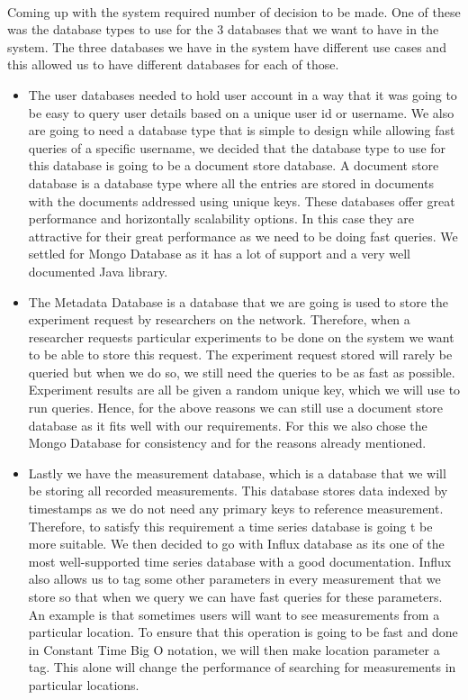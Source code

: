 \paragraph{}
Coming up with the system required number of decision to be made.
One of these was the database types to use for the 3 databases that we want to have in the system.
The three databases we have in the system have different use cases and this allowed us to have different databases for each of those.
\begin{itemize}
    \item The user databases needed to hold user account in a way that it was going to be easy to query user details based on a unique user id or username.
    We also are going to need a database type that is simple to design while allowing fast queries of a specific username, we decided that the database type to use for this database is going to be a document store database.
    A document store database is a database type where all the entries are stored in documents with the documents addressed using unique keys\cite{nosql_dbs}.
    These databases offer great performance and horizontally scalability options\cite{nosql_dbs}.
    In this case they are attractive for their great performance as we need to be doing fast queries.
    We settled for Mongo Database as it has a lot of support and a very well documented Java library.
    \item The Metadata Database is a database that we are going is used to store the experiment request by researchers on the network.
    Therefore, when a researcher requests particular experiments to be done on the system we want to be able to store this request.
    The experiment request stored will rarely be queried but when we do so, we still  need the queries to be as fast as possible.
    Experiment results are all be given a random unique key, which we will use to run queries.
    Hence, for the above reasons we can still use a document store database as it fits well with our requirements.
    For this we also chose the Mongo Database for consistency and for the reasons already mentioned.
    \item Lastly we have the measurement database, which is a database that we will be storing all recorded measurements.
    This database stores data indexed by timestamps as we do not need any primary keys to reference measurement.
    Therefore, to satisfy this requirement a time series database is going t be more suitable.
    We then decided to go with Influx database as its one of the most well-supported time series database with a good documentation.
    Influx also allows us to tag some other parameters in every measurement that we store so that when we query we can have fast queries for these parameters.
    An example is that sometimes users will want to see measurements from a particular location.
    To ensure that this operation is going to be fast and done in Constant Time Big O notation, we will then make location parameter a tag.
    This alone will change the performance of searching for measurements in particular locations.
\end{itemize}
